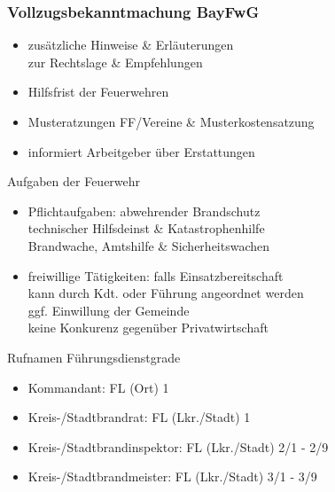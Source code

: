 \begin{normbox}{\subsubsection{Vollzugsbekanntmachung BayFwG}}
    \begin{itemize}
        \item zusätzliche Hinweise \& Erläuterungen\\
        \ra zur Rechtslage \& Empfehlungen
        \item Hilfsfrist der Feuerwehren
        \item Musteratzungen FF/Vereine \& Musterkostensatzung
        \item informiert Arbeitgeber über Erstattungen
    \end{itemize}
\end{normbox}
\begin{sectionbox}{Aufgaben der Feuerwehr}
    \begin{itemize}
        \item Pflichtaufgaben: abwehrender Brandschutz\\
        \ra technischer Hilfsdeinst \& Katastrophenhilfe\\
        \ra Brandwache, Amtshilfe \& Sicherheitswachen
        \item freiwillige Tätigkeiten: falls Einsatzbereitschaft\\
        \ra kann durch Kdt. oder Führung angeordnet werden\\
        \ra ggf. Einwillung der Gemeinde\\
        \ra keine Konkurenz gegenüber Privatwirtschaft 
    \end{itemize}
\end{sectionbox}
\begin{hintbox}{Rufnamen Führungsdienstgrade}
    \begin{itemize}
        \item Kommandant: FL (Ort) 1
        \item Kreis-/Stadtbrandrat: FL (Lkr./Stadt) 1
        \item Kreis-/Stadtbrandinspektor: FL (Lkr./Stadt) 2/1 - 2/9
        \item  Kreis-/Stadtbrandmeister: FL (Lkr./Stadt) 3/1 - 3/9
    \end{itemize}
\end{hintbox}
